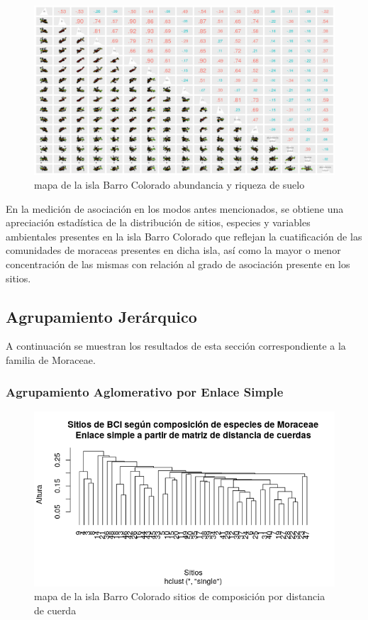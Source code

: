 \documentclass[11pt,]{article}
\begin{document}
\begin{figure}
\centering
\includegraphics[width=1.00000\textwidth]{matriz_correlacion_suelo_abun_riq_spearman.png}
\caption{mapa de la isla Barro Colorado abundancia y riqueza de suelo
\label{fig:bci_map}}
\end{figure}

En la medición de asociación en los modos antes mencionados, se obtiene
una apreciación estadística de la distribución de sitios, especies y
variables ambientales presentes en la isla Barro Colorado que reflejan
la cuatificación de las comunidades de moraceas presentes en dicha isla,
así como la mayor o menor concentración de las mismas con relación al
grado de asociación presente en los sitios.

\subsection{Agrupamiento Jerárquico}\label{agrupamiento-jeruxe1rquico}

A continuación se muestran los resultados de esta sección
correspondiente a la familia de Moraceae.

\subsubsection{Agrupamiento Aglomerativo por Enlace
Simple}\label{agrupamiento-aglomerativo-por-enlace-simple}

\begin{figure}
\centering
\includegraphics[width=1.00000\textwidth]{sitios_composicion_distancia_cuerdas.png}
\caption{mapa de la isla Barro Colorado sitios de composición por
distancia de cuerda \label{fig:bci_map}}
\end{figure}
\end{document}
